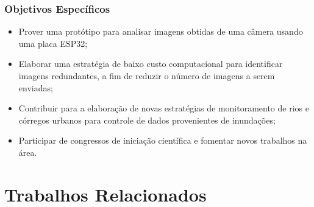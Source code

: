 \documentclass[12pt]{article}
\begin{document}
\begin{spacing}{1}
\subsubsection{Objetivos Específicos}
\begin{itemize}
    \item Prover uma protótipo para analisar imagens obtidas de uma câmera usando uma placa ESP32;
    \item Elaborar uma estratégia de baixo custo computacional para identificar imagens redundantes, a fim de reduzir o número de imagens a serem enviadas;
    \item Contribuir para a elaboração de novas estratégias de monitoramento de rios e córregos urbanos para controle de dados provenientes de inundações;
    \item Participar de congressos de iniciação científica e fomentar novos trabalhos na área.
\end{itemize}

\section{Trabalhos Relacionados}



\end{spacing}
\end{document}
